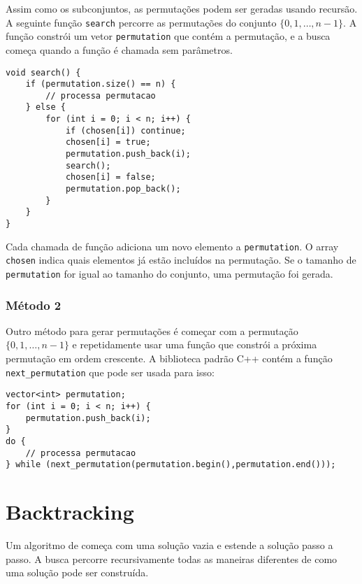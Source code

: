 Assim como os subconjuntos, as permutações podem ser geradas
usando recursão.
A seguinte função \texttt{search} percorre
as permutações do conjunto $\{0,1,\ldots,n-1\}$.
A função constrói um vetor \texttt{permutation}
que contém a permutação,
e a busca começa quando a função é
chamada sem parâmetros.

\begin{lstlisting}
void search() {
    if (permutation.size() == n) {
        // processa permutacao
    } else {
        for (int i = 0; i < n; i++) {
            if (chosen[i]) continue;
            chosen[i] = true;
            permutation.push_back(i);
            search();
            chosen[i] = false;
            permutation.pop_back();
        }
    }
}
\end{lstlisting}

Cada chamada de função adiciona um novo elemento a
\texttt{permutation}.
O array \texttt{chosen} indica quais
elementos já estão incluídos na permutação.
Se o tamanho de \texttt{permutation} for igual ao tamanho do conjunto,
uma permutação foi gerada.

\subsubsection{Método 2}


Outro método para gerar permutações
é começar com a permutação
$\{0,1,\ldots,n-1\}$ e repetidamente
usar uma função que constrói a próxima permutação
em ordem crescente.
A biblioteca padrão C++ contém a função
\texttt{next\_permutation} que pode ser usada para isso:

\begin{lstlisting}
vector<int> permutation;
for (int i = 0; i < n; i++) {
    permutation.push_back(i);
}
do {
    // processa permutacao
} while (next_permutation(permutation.begin(),permutation.end()));
\end{lstlisting}

\section{Backtracking}


Um algoritmo de 
começa com uma solução vazia
e estende a solução passo a passo.
A busca percorre recursivamente
todas as maneiras diferentes de como
uma solução pode ser construída.

